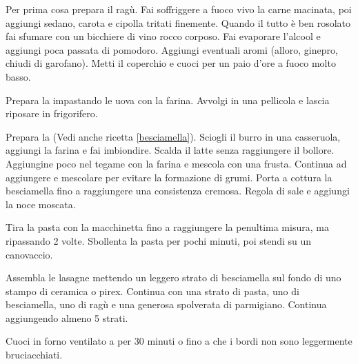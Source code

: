 \begin{method}
Per prima cosa prepara il ragù. Fai soffriggere a fuoco vivo la carne macinata, poi aggiungi sedano, carota e cipolla tritati finemente. Quando il tutto è ben rosolato fai sfumare con un bicchiere di vino rocco corposo. Fai evaporare l'alcool e aggiungi poca passata di pomodoro. Aggiungi eventuali aromi (alloro, ginepro, chiudi di garofano). Metti il coperchio e cuoci per un paio d'ore a fuoco molto basso.

Prepara la  impastando le uova con la farina. Avvolgi in una pellicola e lascia riposare in frigorifero.

Prepara la  (Vedi anche ricetta \ref{besciamella}). Sciogli il burro in una casseruola, aggiungi la farina e fai imbiondire. Scalda il latte senza raggiungere il bollore. Aggiungine poco nel tegame con la farina e mescola con una frusta. Continua ad aggiungere e mescolare per evitare la formazione di grumi. Porta a cottura la besciamella fino a raggiungere una consistenza cremosa. Regola di sale e aggiungi la noce moscata.

Tira la pasta con la macchinetta fino a raggiungere la penultima misura, ma ripassando 2 volte. Sbollenta la pasta per pochi minuti, poi stendi su un canovaccio.

Assembla le lasagne mettendo un leggero strato di besciamella sul fondo di uno stampo di ceramica o pirex. Continua con una strato di pasta, uno di besciamella, uno di ragù e una generosa spolverata di parmigiano. Continua aggiungendo almeno 5 strati.

Cuoci in forno ventilato a  per 30 minuti o fino a che i bordi non sono leggermente bruciacchiati.


\end{method}




